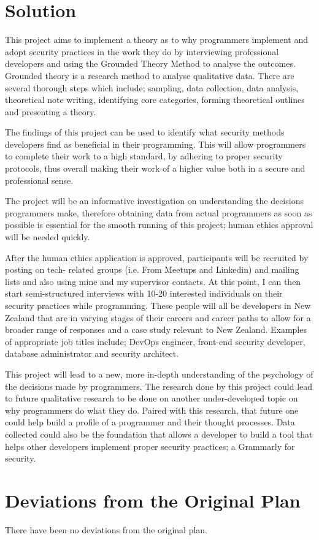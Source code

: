 \section{Solution}

\par This project aims to implement a theory as to why programmers implement and adopt security practices in the work they do by interviewing professional developers and using the Grounded Theory Method to analyse the outcomes. Grounded theory is a research method to analyse qualitative data. There are several thorough steps which include; sampling, data collection, data analysis, theoretical note writing, identifying core categories, forming theoretical outlines and presenting a theory.
\newline
\par The findings of this project can be used to identify what security methods developers find as beneficial in their programming. This will allow programmers to complete their work to a high standard, by adhering to proper security protocols, thus overall making their work of a higher value both in a secure and professional sense.
\newline
\par The project will be an informative investigation on understanding the decisions programmers make, therefore obtaining data from actual programmers as soon as possible is essential for the smooth running of this project; human ethics approval will be needed quickly.
\newline
\par After the human ethics application is approved, participants will be recruited by posting on tech- related groups (i.e. From Meetups and Linkedin) and mailing lists and also using mine and my supervisor contacts. At this point, I can then start semi-structured interviews with 10-20 interested individuals on their security practices while programming. These people will all be developers in New Zealand that are in varying stages of their careers and career paths to allow for a broader range of responses and a case study relevant to New Zealand. Examples of appropriate job titles include; DevOps engineer, front-end security developer, database administrator and security architect.
\newline
\par This project will lead to a new, more in-depth understanding of the psychology of the decisions made by programmers. The research done by this project could lead to future qualitative research to be done on another under-developed topic on why programmers do what they do. Paired with this research, that future one could help build a profile of a programmer and their thought processes. Data collected could also be the foundation that allows a developer to build a tool that helps other developers implement proper security practices; a Grammarly for security.

\section{Deviations from the Original Plan}
There have been no deviations from the original plan.